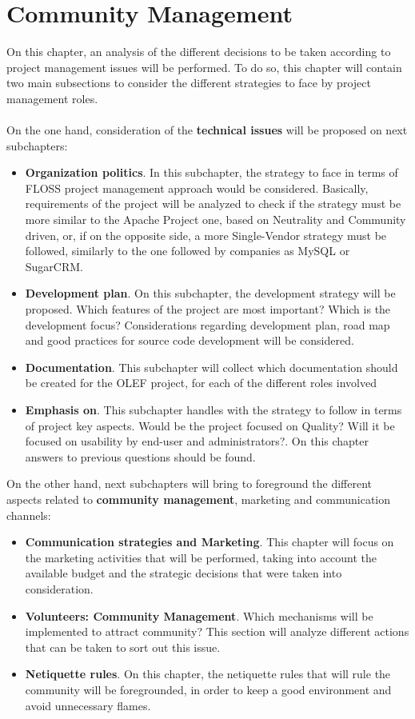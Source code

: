 \documentclass[11pt]{article}
\begin{document}
\pagebreak

\section{Community Management}
On this chapter, an analysis of the different decisions to be taken according to project management issues will be performed. To do so, this chapter will contain two main subsections to consider the different strategies to face by project management roles.\\
\\
On the one hand, consideration of the \textbf{technical issues} will be proposed on next subchapters:
\begin{itemize}\itemsep0pt
\item{\textbf{Organization politics}}. In this subchapter, the strategy to face in terms of FLOSS project management approach would be considered. Basically, requirements of the project will be analyzed to check if the strategy must be more similar to the Apache Project one, based on Neutrality and Community driven, or, if on the opposite side, a more Single-Vendor strategy must be followed, similarly to the one followed by companies as MySQL or SugarCRM.
\item{\textbf{Development plan}}. On this subchapter, the development strategy will be proposed. Which features of the project are most important? Which is the development focus? Considerations regarding development plan, road map and good practices for source code development will be considered.

\item{\textbf{Documentation}}. This subchapter will collect which documentation should be created for the OLEF project, for each of the different roles involved 
\item{\textbf{Emphasis on}}. This subchapter handles with the strategy to follow in terms of project key aspects. Would be the project focused on Quality? Will it be focused on usability by end-user and administrators?. On this chapter answers to previous questions should be found.
\end{itemize}
On the other hand, next subchapters will bring to foreground the different aspects related to \textbf{community management}, marketing and communication channels:
\begin{itemize}\itemsep0pt
\item{\textbf{Communication strategies and Marketing}}. This chapter will focus on the marketing activities that will be performed, taking into account the available budget and the strategic decisions that were taken into consideration.
\item{\textbf{Volunteers: Community Management}}. Which mechanisms will be implemented to attract community? This section will analyze different actions that can be taken to sort out this issue. 
\item{\textbf{Netiquette rules}}. On this chapter, the netiquette rules that will rule the community will be foregrounded, in order to keep a good environment and avoid unnecessary flames.
\end{itemize}
\end{document}
